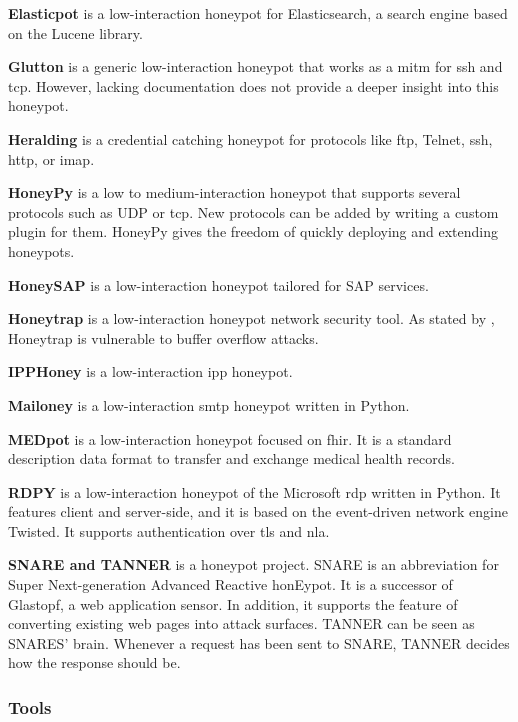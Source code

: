 \textbf{Elasticpot} \cite{elasticpot2021} is a low-interaction honeypot for Elasticsearch, a search engine based on the Lucene library.

\textbf{Glutton} \cite{glutton2021} is a generic low-interaction honeypot that works as a \ac{mitm} for \ac{ssh} and \ac{tcp}.
However, lacking documentation does not provide a deeper insight into this honeypot.

\textbf{Heralding} \cite{heralding2021} is a credential catching honeypot for protocols like \ac{ftp}, Telnet, \ac{ssh}, \ac{http}, or \ac{imap}.

\textbf{HoneyPy} \cite{honeysap2021} is a low to medium-interaction honeypot that supports several protocols such as UDP or \ac{tcp}.
New protocols can be added by writing a custom plugin for them.
HoneyPy gives the freedom of quickly deploying and extending honeypots.

\textbf{HoneySAP} \cite{honeysap2021} is a low-interaction honeypot tailored for SAP services.

\textbf{Honeytrap} \cite{honeytrap2021} is a low-interaction honeypot network security tool.
As stated by \citet*{honeytrap2021}, Honeytrap is vulnerable to buffer overflow attacks.

\textbf{IPPHoney} \cite{ipphoney2021} is a low-interaction \ac{ipp} honeypot.

\textbf{Mailoney} \cite{mailoney2021} is a low-interaction \ac{smtp} honeypot written in Python.

\textbf{MEDpot} \cite{medpot2021} is a low-interaction honeypot focused on \ac{fhir}.
It is a standard description data format to transfer and exchange medical health records.

\textbf{RDPY} \cite{rdpy2021} is a low-interaction honeypot of the Microsoft \ac{rdp} written in Python.
It features client and server-side, and it is based on the event-driven network engine Twisted.
It supports authentication over \ac{tls} and \ac{nla}.

\textbf{SNARE and TANNER} \cite{snare2021, tanner2021} is a honeypot project.
SNARE is an abbreviation for Super Next-generation Advanced Reactive honEypot.
It is a successor of Glastopf, a web application sensor.
In addition, it supports the feature of converting existing web pages into attack surfaces.
TANNER \cite{tanner2021} can be seen as SNARES' brain.
Whenever a request has been sent to SNARE, TANNER decides how the response should be.

\subsubsection{Tools}

